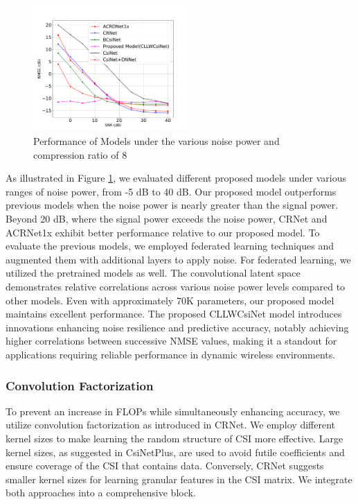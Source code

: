 \documentclass[lettersize,journal]{IEEEtran}
\begin{document}
\begin{figure}
	\centering
	\includegraphics[width=0.53\textwidth]{Figure_1.pdf}
	\caption{Performance of Models under the various noise power and compression ratio of 8}
	\label{fig:Performance of Models under the various noise power}
\end{figure}

As illustrated in Figure \ref{fig:Performance of Models under the various noise power}, we evaluated different proposed models under various ranges of noise power, from -5 dB to 40 dB. Our proposed model outperforms previous models when the noise power is nearly greater than the signal power. Beyond 20 dB, where the signal power exceeds the noise power, CRNet \cite{abn} and ACRNet1x \cite{abx} exhibit better performance relative to our proposed model. To evaluate the previous models, we employed federated learning techniques and augmented them with additional layers to apply noise. For federated learning, we utilized the pretrained models as well. The convolutional latent space demonstrates relative correlations across various noise power levels compared to other models. Even with approximately 70K parameters, our proposed model maintains excellent performance. The proposed CLLWCsiNet model introduces innovations enhancing noise resilience and predictive accuracy, notably achieving higher correlations between successive NMSE values, making it a standout for applications requiring reliable performance in dynamic wireless environments.


\subsubsection{Convolution Factorization} To prevent an increase in FLOPs while simultaneously enhancing accuracy, we utilize convolution factorization as introduced in CRNet\cite{abn}. We employ different kernel sizes to make learning the random structure of CSI more effective. Large kernel sizes, as suggested in CsiNetPlus\cite{abo}, are used to avoid futile coefficients and ensure coverage of the CSI that contains data. Conversely, CRNet\cite{abn} suggests smaller kernel sizes for learning granular features in the CSI matrix. We integrate both approaches into a comprehensive block.
\end{document}
